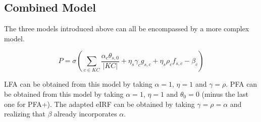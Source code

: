 \documentclass{scrartcl}
\providecommand{\comm}[1]{{\textbf[ #1 ]}}
\providecommand{\commd}[1]{\comm{D: {#1}}}
\begin{document}

\subsection{Combined Model}
The three models introduced above can all be encompassed by a more complex model.

\begin{equation}
P = \sigma(\sum_{c \in KC}\frac{\alpha_c \theta_{s,0}}{|KC|}+\eta_{s} \gamma_{c} g_{s,c} + \eta_{s}\rho_{c} f_{s,c} - \beta_{c})
\end{equation}

LFA can be obtained from this model by taking $\alpha=1$, $\eta=1$ and $\gamma=\rho$. PFA can be obtained from this model by taking $\alpha=1$, $\eta=1$ and $\theta_{0}=0$ (minus the last one for PFA+). The adapted eIRF can be obtained by taking $\gamma=\rho=\alpha$ and realizing that $\beta$ already incorporates $\alpha$.
\end{document}
